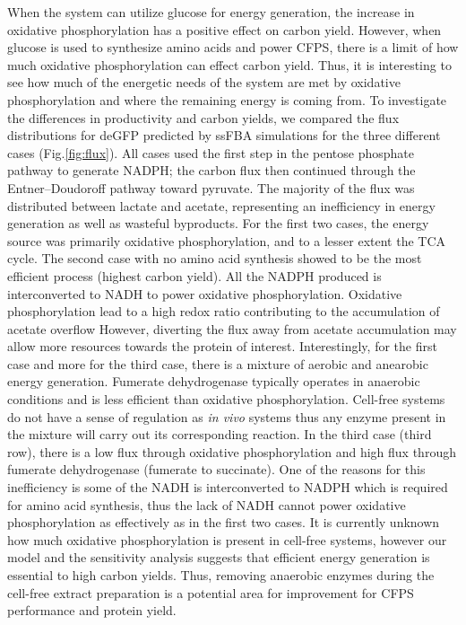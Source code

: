 \documentclass[journal=asbcd6,manuscript=article]{achemso}
\begin{document}
When the system can utilize glucose for energy generation, the increase in oxidative phosphorylation has a positive effect on carbon yield.
However, when glucose is used to synthesize amino acids and power CFPS, there is a limit of how much oxidative phosphorylation can effect carbon yield.
Thus, it is interesting to see how much of the energetic needs of the system are met by oxidative phosphorylation and where the remaining energy is coming from.
To investigate the differences in productivity and carbon yields, we compared the flux distributions for deGFP predicted by ssFBA simulations for the three different cases (Fig.\ref{fig:flux}).
All cases used the first step in the pentose phosphate pathway to generate NADPH;
the carbon flux then continued through the Entner–Doudoroff pathway toward pyruvate.
The majority of the flux was distributed between lactate and acetate, representing an inefficiency in energy generation as well as wasteful byproducts.
For the first two cases, the energy source was primarily oxidative phosphorylation, and to a lesser extent the TCA cycle.
The second case with no amino acid synthesis showed to be the most efficient process (highest carbon yield).
All the NADPH produced is interconverted to NADH to power oxidative phosphorylation.
Oxidative phosphorylation lead to a high redox ratio contributing to the accumulation of acetate overflow
However, diverting the flux away from acetate accumulation may allow more resources towards the protein of interest.
Interestingly, for the first case and more for the third case, there is a mixture of aerobic and anearobic energy generation.
Fumerate dehydrogenase typically operates in anaerobic conditions and is less efficient than oxidative phosphorylation.
Cell-free systems do not have a sense of regulation as \textit{in vivo} systems thus any enzyme present in the mixture will carry out its corresponding reaction.
In the third case (third row), there is a low flux through oxidative phosphorylation and high flux through fumerate dehydrogenase (fumerate to succinate).
One of the reasons for this inefficiency is some of the NADH is interconverted to NADPH which is required for amino acid synthesis, thus the lack of NADH cannot power oxidative phosphorylation as effectively as in the first two cases.
It is currently unknown how much oxidative phosphorylation is present in cell-free systems, however our model and the sensitivity analysis suggests that efficient energy generation is essential to high carbon yields.
Thus, removing anaerobic enzymes during the cell-free extract preparation is a potential area for improvement for CFPS performance and protein yield.
\end{document}
